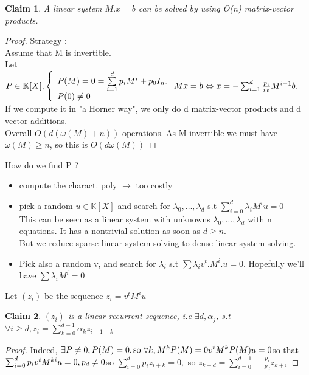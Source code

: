 \documentclass{article}
\newtheorem{claim}{Claim}
\theoremstyle{definition}
\theoremstyle{remark}
\newcommand{\K}{\mathbb{K}}
\begin{document}
\begin{claim}
	A linear system $M.x = b$ can be solved by using O(n) matrix-vector products.
\end{claim}
\begin{proof}
	Strategy :\\
	Assume that M is invertible.\\
	Let $P \in \K[X], \left\{\begin{array}{l l}
	P(M) = 0 = \sum\limits_{i = 1}^d p_iM^i + p_0I_n.\\
	P(0) \neq 0
	\end{array}\right.\\
	Mx = b \Leftrightarrow x = -\sum_{i = 1}^{d} \frac{p_i}{p_0}M^{i-1}b.$\\
	If we compute it in "a Horner way", we only do d matrix-vector products and d vector additions.\\
	
	Overall $O(d(\omega(M)+n))$ operations. As M invertible we must have $\omega(M) \geq n$, so this is $O(d\omega(M))$
\end{proof}
How do we find P ?
\begin{itemize}
	\item compute the charact. poly $\rightarrow$ too costly
	\item pick a random $u \in \K[X]$ and search for $\lambda_0,\dots,\lambda_d$ s.t $\sum_{i=0}^{d}\lambda_i M^i u = 0$\\
	This can be seen as a linear system with unknowns $\lambda_0,\dots,\lambda_d$ with n equations. It has a nontrivial solution as soon as $d \geq n$.\\
	But we reduce sparse linear system solving to dense linear system solving.
	\item Pick also a random v, and search for $\lambda_i$ s.t $\sum \lambda_iv^t.M^i.u = 0$. Hopefully we'll have $\sum\lambda_iM^i = 0$
\end{itemize}
Let $(z_i)$ be the sequence $z_i = v^tM^iu$
\begin{claim}
	$(z_i)$ is a linear recurrent sequence, i.e $\exists d,\alpha_j$, s.t $\forall i \geq d, z_i = \sum_{k=0}^{d-1}\alpha_k z_{i-1-k}$
\end{claim}
\begin{proof}
	Indeed, $\exists P\neq 0, P(M) = 0,\\
	\text{so } \forall k, M^k P(M) = 0\\
	v^t M^k P(M) u = 0\\
	$so that $\sum_{i=0}^{d}p_i v^t M^{ki} u = 0, p_d\neq 0\\
	$so $\sum_{i = 0}^d p_i z_{i+k} = 0, $ so $ z_{k+d} = \sum_{i = 0}^{d - 1} -\frac{p_i}{p_d} z_{k+i}$
\end{proof}
\end{document}
